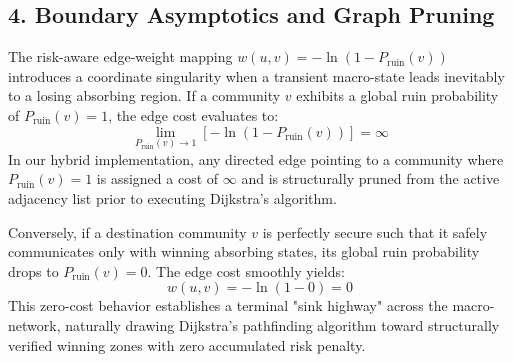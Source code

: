 \documentclass[9pt,twocolumn,twoside]{pnas-report}
\begin{document}
\subsection*{4. Boundary Asymptotics and Graph Pruning}
The risk-aware edge-weight mapping $w(u,v) = -\ln(1 - P_{\text{ruin}}(v))$ introduces a coordinate singularity when a transient macro-state leads inevitably to a losing absorbing region. If a community $v$ exhibits a global ruin probability of $P_{\text{ruin}}(v) = 1$, the edge cost evaluates to:
\begin{equation}
\lim_{P_{\text{ruin}}(v) \to 1} \left[-\ln\left(1 - P_{\text{ruin}}(v)\right)\right] = \infty
\end{equation}
In our hybrid implementation, any directed edge pointing to a community where $P_{\text{ruin}}(v) = 1$ is assigned a cost of $\infty$ and is structurally pruned from the active adjacency list prior to executing Dijkstra's algorithm.

Conversely, if a destination community $v$ is perfectly secure such that it safely communicates only with winning absorbing states, its global ruin probability drops to $P_{\text{ruin}}(v) = 0$. The edge cost smoothly yields:
\begin{equation}
w(u,v) = -\ln(1 - 0) = 0
\end{equation}
This zero-cost behavior establishes a terminal "sink highway" across the macro-network, naturally drawing Dijkstra's pathfinding algorithm toward structurally verified winning zones with zero accumulated risk penalty.
\end{document}

